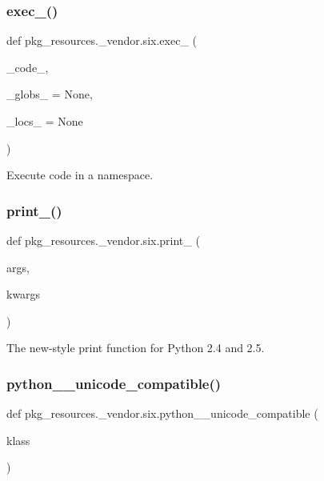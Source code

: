 \subsubsection{\texorpdfstring{exec\+\_\+()}{exec\_()}}
{\footnotesize\ttfamily def pkg\+\_\+resources.\+\_\+vendor.\+six.\+exec\+\_\+ (\begin{DoxyParamCaption}\item[{}]{\+\_\+code\+\_\+,  }\item[{}]{\+\_\+globs\+\_\+ = {\ttfamily None},  }\item[{}]{\+\_\+locs\+\_\+ = {\ttfamily None} }\end{DoxyParamCaption})}

\begin{DoxyVerb}Execute code in a namespace.\end{DoxyVerb}
 \mbox{\label{namespacepkg__resources_1_1__vendor_1_1six_a75bc73d34d958d7723c48b5586d91313}} 
\subsubsection{\texorpdfstring{print\+\_\+()}{print\_()}}
{\footnotesize\ttfamily def pkg\+\_\+resources.\+\_\+vendor.\+six.\+print\+\_\+ (\begin{DoxyParamCaption}\item[{}]{args,  }\item[{}]{kwargs }\end{DoxyParamCaption})}

\begin{DoxyVerb}The new-style print function for Python 2.4 and 2.5.\end{DoxyVerb}
 \mbox{\label{namespacepkg__resources_1_1__vendor_1_1six_aec1ccf1db6cd3a0b554993240a1ca321}} 
\subsubsection{\texorpdfstring{python\+\_\+\_\+unicode\+\_\+compatible()}{python\_2\_unicode\_compatible()}}
{\footnotesize\ttfamily def pkg\+\_\+resources.\+\_\+vendor.\+six.\+python\+\_\+\_\+unicode\+\_\+compatible (\begin{DoxyParamCaption}\item[{}]{klass }\end{DoxyParamCaption})}

